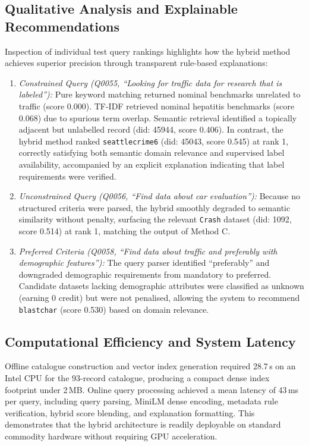 \documentclass[conference]{IEEEtran}
\begin{document}
\subsection{Qualitative Analysis and Explainable Recommendations}
Inspection of individual test query rankings highlights how the hybrid method achieves superior precision through transparent rule-based explanations:
\begin{enumerate}
\item \emph{Constrained Query (Q0055, ``Looking for traffic data for research that is labeled''):} Pure keyword matching returned nominal benchmarks unrelated to traffic (score 0.000). TF-IDF retrieved nominal hepatitis benchmarks (score 0.068) due to spurious term overlap. Semantic retrieval identified a topically adjacent but unlabelled record (did: 45944, score 0.406). In contrast, the hybrid method ranked \texttt{seattlecrime6} (did: 45043, score 0.545) at rank 1, correctly satisfying both semantic domain relevance and supervised label availability, accompanied by an explicit explanation indicating that label requirements were verified.
\item \emph{Unconstrained Query (Q0056, ``Find data about car evaluation''):} Because no structured criteria were parsed, the hybrid smoothly degraded to semantic similarity without penalty, surfacing the relevant \texttt{Crash} dataset (did: 1092, score 0.514) at rank 1, matching the output of Method C.
\item \emph{Preferred Criteria (Q0058, ``Find data about traffic and preferably with demographic features''):} The query parser identified ``preferably'' and downgraded demographic requirements from mandatory to preferred. Candidate datasets lacking demographic attributes were classified as unknown (earning 0 credit) but were not penalised, allowing the system to recommend \texttt{blastchar} (score 0.530) based on domain relevance.
\end{enumerate}

\subsection{Computational Efficiency and System Latency}
Offline catalogue construction and vector index generation required 28.7\,s on an Intel CPU for the 93-record catalogue, producing a compact dense index footprint under 2\,MB. Online query processing achieved a mean latency of 43\,ms per query, including query parsing, MiniLM dense encoding, metadata rule verification, hybrid score blending, and explanation formatting. This demonstrates that the hybrid architecture is readily deployable on standard commodity hardware without requiring GPU acceleration.
\end{document}
